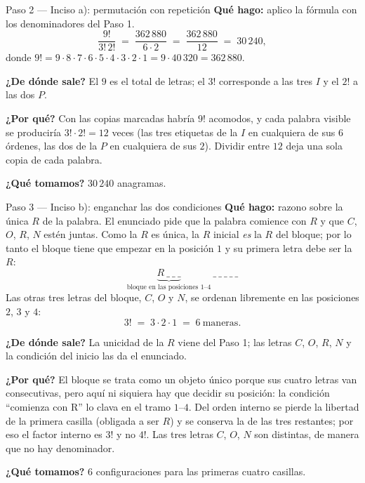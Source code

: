 \documentclass[11pt]{article}
\begin{document}
\begin{paso}{Paso 2 --- Inciso a): permutación con repetición}
\textbf{Qué hago:} aplico la fórmula con los denominadores del Paso 1.
\[
\frac{9!}{3!\,2!} \;=\; \frac{362\,880}{6\cdot 2} \;=\; \frac{362\,880}{12} \;=\; 30\,240 ,
\]
donde $9!=9\cdot8\cdot7\cdot6\cdot5\cdot4\cdot3\cdot2\cdot1=9\cdot 40\,320=362\,880$.

\textbf{¿De dónde sale?} El $9$ es el total de letras; el $3!$ corresponde a las tres $I$ y el $2!$ a las dos
$P$.

\textbf{¿Por qué?} Con las copias marcadas habría $9!$ acomodos, y cada palabra visible se produciría
$3!\cdot 2! = 12$ veces (las tres etiquetas de la $I$ en cualquiera de sus $6$ órdenes, las dos de la $P$ en
cualquiera de sus $2$). Dividir entre $12$ deja una sola copia de cada palabra.

\textbf{¿Qué tomamos?} $30\,240$ anagramas.
\end{paso}

\begin{paso}{Paso 3 --- Inciso b): enganchar las dos condiciones}
\textbf{Qué hago:} razono sobre la única $R$ de la palabra. El enunciado pide que la palabra comience con $R$
y que $C$, $O$, $R$, $N$ estén juntas. Como la $R$ es única, la $R$ inicial \emph{es} la $R$ del bloque; por
lo tanto el bloque tiene que empezar en la posición $1$ y su primera letra debe ser la $R$:
\[
\underbrace{R\ \_\ \_\ \_}_{\text{bloque en las posiciones }1\text{--}4}\ \_\ \_\ \_\ \_\ \_
\]
Las otras tres letras del bloque, $C$, $O$ y $N$, se ordenan libremente en las posiciones $2$, $3$ y $4$:
\[
3! \;=\; 3\cdot 2\cdot 1 \;=\; 6 \ \text{maneras}.
\]

\textbf{¿De dónde sale?} La unicidad de la $R$ viene del Paso 1; las letras $C$, $O$, $R$, $N$ y la
condición del inicio las da el enunciado.

\textbf{¿Por qué?} El bloque se trata como un objeto único porque sus cuatro letras van consecutivas, pero
aquí ni siquiera hay que decidir su posición: la condición ``comienza con R'' lo clava en el tramo $1$--$4$.
Del orden interno se pierde la libertad de la primera casilla (obligada a ser $R$) y se conserva la de las
tres restantes; por eso el factor interno es $3!$ y no $4!$. Las tres letras $C$, $O$, $N$ son distintas, de
manera que no hay denominador.

\textbf{¿Qué tomamos?} $6$ configuraciones para las primeras cuatro casillas.
\end{paso}
\end{document}
